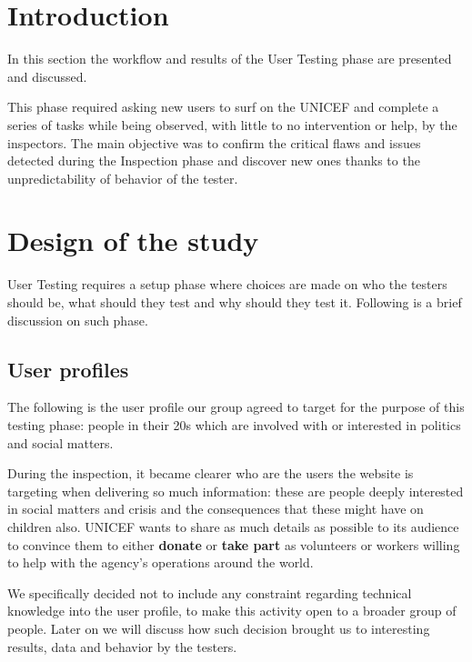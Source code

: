 \section{Introduction}
In this section the workflow and results of the User Testing phase are presented and discussed.

This phase required asking new users to surf on the UNICEF and complete a series of tasks while being observed, with little to no intervention or help, by the inspectors. The main objective was to confirm the critical flaws and issues detected during the Inspection phase and discover new ones thanks to the unpredictability of behavior of the tester.

\section{Design of the study}
User Testing requires a setup phase where choices are made on who the testers should be, what should they test and why should they test it. Following is a brief discussion on such phase.

\subsection{User profiles}
The following is the user profile our group agreed to target for the purpose of this testing phase: people in their 20s which are involved with or interested in politics and social matters.

During the inspection, it became clearer who are the users the website is targeting when delivering so much information: these are people deeply interested in social matters and crisis and the consequences that these might have on children also. UNICEF wants to share as much details as possible to its audience to convince them to either \textbf{donate} or \textbf{take part} as volunteers or workers willing to help with the agency's operations around the world.

We specifically decided not to include any constraint regarding technical knowledge into the user profile, to make this activity open to a broader group of people. Later on we will discuss how such decision brought us to interesting results, data and behavior by the testers.

